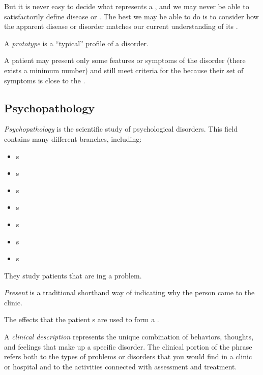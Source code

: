 But it is never easy to decide what represents a , and we may never be able to satisfactorily define disease or .
The best we may be able to do is to consider how the apparent disease or disorder matches our current understanding of its .

\begin{definition}[Prototype]\label{def:Prototype}
  A \emph{prototype} is a ``typical'' profile of a disorder.
\end{definition}

A patient may present only some features or symptoms of the disorder (there exists a minimum number) and still meet criteria for the  because their set of symptoms is close to the .

\subsection{Psychopathology}\label{subsec:Psychopathology}
\begin{definition}[Psychopathology]\label{def:Psychopathology}
  \emph{Psychopathology} is the scientific study of psychological disorders.
  This field contains many different branches, including:
  \begin{itemize}[noitemsep]
  \item {}s
  \item {}s
  \item {}s
  \item {}s
  \item {}s
  \item {}s
  \item {}s
  \end{itemize}
\end{definition}

They study patients that are ing a problem.

\begin{definition}[Present]\label{def:Present}
  \emph{Present} is a traditional shorthand way of indicating why the person came to the clinic.
\end{definition}

The effects that the patient s are used to form a .
\begin{definition}\label{def:Clinical_Description}
  A \emph{clinical description} represents the unique combination of behaviors, thoughts, and feelings that make up a specific disorder.
  The clinical portion of the phrase refers both to the types of problems or disorders that you would find in a clinic or hospital and to the activities connected with assessment and treatment.
\end{definition}


